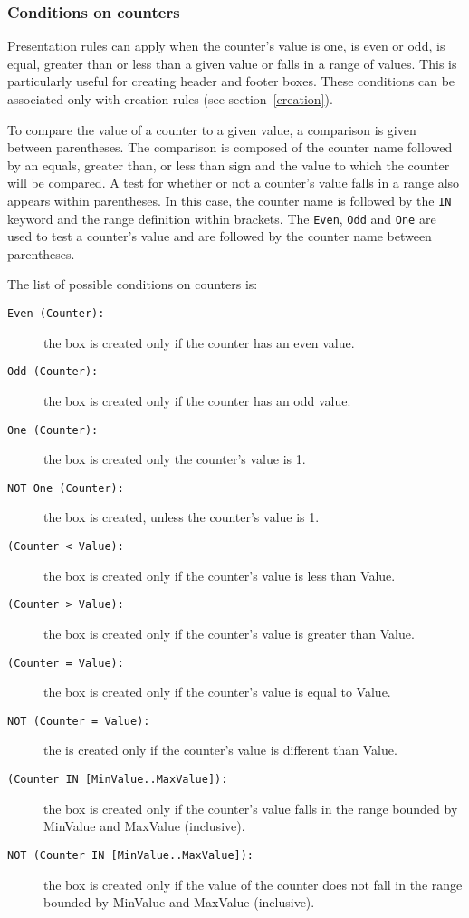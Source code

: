 \subsubsection{Conditions on counters}

Presentation rules can apply when the counter's value is one, is even or odd, is
equal, greater than or less than a given value or falls in a range of
values.  This is particularly useful for creating header and
footer boxes.
These conditions can be associated only with creation rules
(see section~\ref{creation}).

To compare the value of a
counter to a given value, a comparison is given between parentheses.
The comparison is composed of the counter name followed by an equals,
greater than, or less than sign and the value to which the counter
will be compared.  A test for whether or not a counter's value falls in a
range also appears within parentheses.  In this case, the counter name
is followed by the {\tt IN} keyword and the range definition within
brackets.  The {\tt Even}, {\tt Odd} and {\tt One} are used to test
a counter's value and are followed by the counter name between
parentheses.

The list of possible conditions on counters is:

\begin{description}
\item[ {\tt Even (Counter):} ]the box is created only if the counter
has an even value.
\item[ {\tt Odd (Counter):} ]the box is created only if the counter
has an odd value.
\item[ {\tt One (Counter):} ]the box is created only the counter's
value is 1.
\item[ {\tt NOT One (Counter):} ]the box is created, unless the
counter's value is 1.
\item[ {\tt (Counter < Value):} ]the box is created only if the
counter's value is less than Value.
\item[ {\tt (Counter > Value):} ]the box is created only if the
counter's value is greater than Value.
\item[ {\tt (Counter = Value):} ]the box is created only if the
counter's value is equal to Value.
\item[ {\tt NOT (Counter = Value):} ]the is created only if the
counter's value is different than Value.
\item[ {\tt (Counter IN [MinValue..MaxValue]):} ]the box is created
only if the counter's value falls in the range bounded by MinValue and
MaxValue (inclusive).
\item[ {\tt NOT (Counter IN [MinValue..MaxValue]):} ]the box is
created only if the value of the counter does not fall in the range bounded
by MinValue and MaxValue (inclusive).
\end{description}

